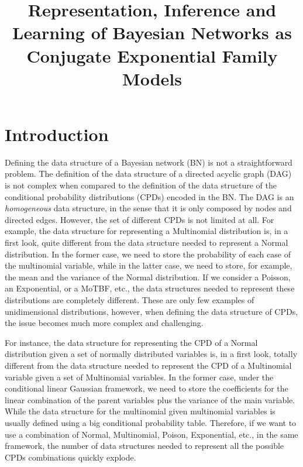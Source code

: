 \documentclass[11pt, oneside]{article}   	%
\numberwithin{figure}{section}
\numberwithin{equation}{section}
\numberwithin{table}{section}
\theoremstyle{definition}
\begin{document}
\title{ Representation, Inference and Learning of Bayesian Networks as Conjugate Exponential Family Models }

\maketitle
\begin{abstract}

\end{abstract}

\section{Introduction}

Defining the data structure of a Bayesian network (BN) is not a straightforward problem. The definition of the data structure of a directed acyclic graph (DAG) is not complex when compared to the definition of the data structure of the conditional probability distributions (CPDs) encoded in the BN. The DAG is an \textit{homogeneous} data structure, in the sense that it is only composed by nodes and directed edges. However, the set of different CPDs is not limited at all. For example, the data structure for representing a Multinomial distribution is, in a first look, quite different from the data structure needed to represent a Normal distribution. In the former case, we need to store the probability of each case of the multinomial variable, while in the latter case, we need to store, for example, the mean and the variance of the Normal distribution. If we consider a Poisson, an Exponential, or a MoTBF, etc., the data structures needed to represent these distributions are completely different. These are only few examples of unidimensional distributions, however, when defining the data structure of CPDs, the issue becomes much more complex and challenging. 

For instance, the data structure for representing the CPD of a Normal distribution given a set of normally distributed variables is, in a first look, totally different from the data structure needed to represent the CPD of a Multinomial variable given a set of Multinomial variables. In the former case, under the conditional linear Gaussian framework, we need to store the coefficients for the linear combination of the parent variables plus the variance of the main variable. While the data structure for the multinomial given multinomial variables is usually defined using a big conditional probability table. Therefore, if we want to use a combination of Normal, Multinomial, Poison, Exponential, etc., in the same framework, the number of data structures needed to represent all the possible CPDs combinations quickly explode.
\end{document}
